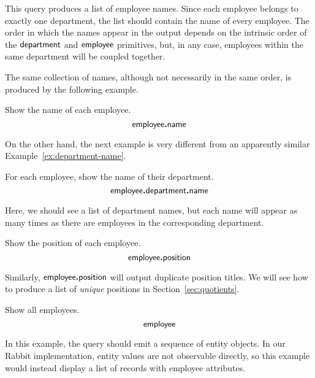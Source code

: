 This query produces a list of employee names.  Since each employee belongs to
exactly one department, the list should contain the name of every employee.
The order in which the names appear in the output depends on the intrinsic
order of the $\textup{\textsf{department}}$ and $\textup{\textsf{employee}}$ primitives, but, in any case,
employees within the same department will be coupled together.

The same collection of names, although not necessarily in the same order, is
produced by the following example.

\begin{example}
    \label{ex:employee-name}
    Show the name of each employee.
    \begin{equation*}
        \textup{\textsf{employee}}\boldsymbol{.}\textup{\textsf{name}}
    \end{equation*}
\end{example}

On the other hand, the next example is very different from an apparently
similar Example~\ref{ex:department-name}.

\begin{example}
    \label{ex:employee-department-name}
    For each employee, show the name of their department.
    \begin{equation*}
        \textup{\textsf{employee}}\boldsymbol{.}\textup{\textsf{department}}\boldsymbol{.}\textup{\textsf{name}}
    \end{equation*}
\end{example}

Here, we should see a list of department names, but each name will appear as
many times as there are employees in the corresponding department.

\begin{example}
    \label{ex:employee-position}
    Show the position of each employee.
    \begin{equation*}
        \textup{\textsf{employee}}\boldsymbol{.}\textup{\textsf{position}}
    \end{equation*}
\end{example}

Similarly, $\textup{\textsf{employee}}\boldsymbol{.}\textup{\textsf{position}}$ will output duplicate position titles.  We
will see how to produce a list of \emph{unique} positions in
Section~\ref{sec:quotients}.

\begin{example}
    \label{ex:employee}
    Show all employees.
    \begin{equation*}
        \textup{\textsf{employee}}
    \end{equation*}
\end{example}

In this example, the query should emit a sequence of entity objects.  In our
Rabbit implementation, entity values are not observable directly, so this
example would instead display a list of records with employee attributes.


